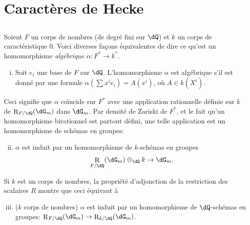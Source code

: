 \documentclass[oneside]{book}
\DeclareMathOperator{\res}{R} %
\theoremstyle{sga-source}
\theoremstyle{sga-source-dash}
\theoremstyle{sga-source-dotdash}
\theoremstyle{sga-source-number-note-dash}
\theoremstyle{sga-source-note-number-dotdash}
\theoremstyle{sga-source-example-dotdash}
\theoremstyle{sga-source-inline-number}
\theoremstyle{sga-source-bare-number}
\theoremstyle{sga-source}
\newcommand{\PrintPage}[1]{}\newcommand{\MathPage}[1]{}\newcommand{\PrintCite}[2]{#1}\newcommand{\var}[3]{#2}
\begin{document}
\PrintPage{208}
\section{Caractères de Hecke}\label{VI:5}





\subsection{}\label{VI:5-1}

Soient $F$ un corps de nombres (de degré fini sur $\dQ$) \var{et $K$ un corps}{et $k$ un corps}{S45-SOL-0859} de 
caractéristique $0$. Voici \var{diverses façon équivalentes}{diverses façons équivalentes}{S45-SOL-0860} de dire ce qu'est un 
homomorphisme \emph{algébrique} $\alpha:F^\ast \to k^\ast$. 
\begin{enumerate}[(i)]
  \item Soit $e_i$ une base de $F$ sur $\dQ$. L'homomorphisme $\alpha$ est 
    algébrique s'il est donné par une formule 
    $\alpha(\sum x^i e_i) = A(x^i)$, où $A\in k(X^i)$. 
\end{enumerate}

Ceci signifie que $\alpha$ coïncide sur $F^\ast$ avec une application 
rationnelle définie sur $k$ de $\res_{F/\dQ}(\dG_m)$ dans $\dG_m$. Par 
densité de Zariski de $F^\ast$, et le fait qu'un homomorphisme birationnel 
est partout défini, une telle application est un homomorphisme de schémas 
en groupes: 
\begin{enumerate}[(i)]
\setcounter{enumi}{1}
  \item $\alpha$ est induit par un homomorphisme de $k$-schémas en groupes 
    \[
      \res_{F/\dQ}(\dG_m)\otimes_\dQ k \to \dG_m \text{.} 
    \] 
\end{enumerate}

Si $k$ est \var{un corps de nombre,}{un corps de nombres,}{S45-SOL-0863} la propriété d'adjonction de la restriction 
des scalaires $R$ montre que ceci équivaut à 
\begin{enumerate}[(i)]
\setcounter{enumi}{2}
  \item ($k$ corps de nombres) $\alpha$ est induit par un homomorphisme de 
    $\dQ$-schémas en groupes: $\res_{F/\dQ}(\dG_m) \to \res_{k/\dQ}(\dG_m)$. 
\end{enumerate}
\end{document}
